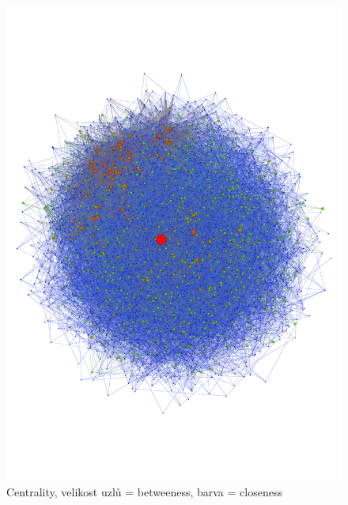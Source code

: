 \documentclass[A4]{article}
\begin{document}
\begin{figure}
    \centering
    \includegraphics[width=1\textwidth]{centralities.pdf}
    \caption{Centrality, velikost uzlů = betweeness, barva = closeness}
    \label{centralities}
\end{figure}

\clearpage
\printbibliography[title={Literatura}, heading=bibintoc]
\end{document}
